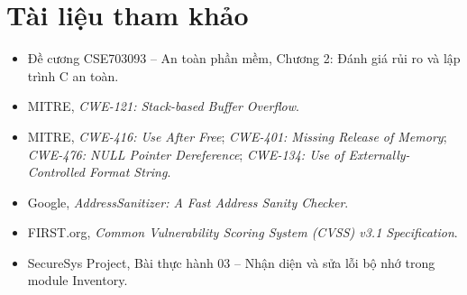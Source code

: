 \section{Tài liệu tham khảo}
\begin{itemize}
    \item Đề cương CSE703093 -- An toàn phần mềm, Chương 2: Đánh giá rủi ro và lập trình C an toàn.
    \item MITRE, \textit{CWE-121: Stack-based Buffer Overflow}.
    \item MITRE, \textit{CWE-416: Use After Free}; \textit{CWE-401: Missing Release of Memory}; \textit{CWE-476: NULL Pointer Dereference}; \textit{CWE-134: Use of Externally-Controlled Format String}.
    \item Google, \textit{AddressSanitizer: A Fast Address Sanity Checker}.
    \item FIRST.org, \textit{Common Vulnerability Scoring System (CVSS) v3.1 Specification}.
    \item SecureSys Project, Bài thực hành 03 -- Nhận diện và sửa lỗi bộ nhớ trong module Inventory.
\end{itemize}